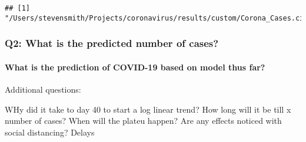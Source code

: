 \documentclass[]{article}
\let\oldparagraph\paragraph
\renewcommand{\paragraph}[1]{\oldparagraph{#1}\mbox{}}
\begin{document}
\begin{verbatim}
## [1] "/Users/stevensmith/Projects/coronavirus/results/custom/Corona_Cases.city.casecor.plot.png"
\end{verbatim}

\subsubsection{Q2: What is the predicted number of
cases?}\label{q2-what-is-the-predicted-number-of-cases}

\paragraph{What is the prediction of COVID-19 based on model thus
far?}\label{what-is-the-prediction-of-covid-19-based-on-model-thus-far}

Additional questions:

WHy did it take to day 40 to start a log linear trend? How long will it
be till x number of cases? When will the plateu happen? Are any effects
noticed with social distancing? Delays
\end{document}
